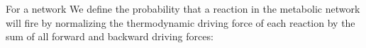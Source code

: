 For a network 
We define the probability that a reaction in the metabolic network will fire by normalizing the thermodynamic driving force of each reaction by the sum of all forward and backward driving forces: